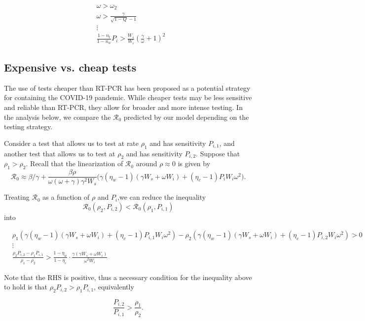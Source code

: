 \documentclass[12pt]{article}
\newcommand{\Rnum}{\mathcal{R}_0}
\theoremstyle{definition} %
\begin{document}
\begin{align}\label{eq:necsuf}
    &\omega > \omega_2 \nonumber \\
    &\omega > \frac{\gamma}{\sqrt{1-Q}-1} \nonumber \\
    &\vdots \nonumber \\
    &\frac{1-n_{t}}{1-n_{w}}P_{i}>\frac{W_{s}}{W_{i}}\left(\frac{\gamma}{\omega}+1\right)^{2}
\end{align}


\subsection{Expensive vs. cheap tests}

The use of tests cheaper than RT-PCR has been proposed as a potential strategy for containing the COVID-19 pandemic. While cheaper tests may be less sensitive and reliable than RT-PCR, they allow for broader and more intense testing. In the analysis below, we compare the $\Rnum$ predicted by our model depending on the testing strategy. 

Consider a test that allows us to test at rate $\rho_1$ and has sensitivity $P_{i,1}$, and another test that allows us to test at $\rho_2$ and has sensitivity $P_{i,2}$. Suppose that $\rho_1 > \rho_2$. Recall that the linearization of $\Rnum$ around $\rho \approx 0$ is given by $$\Rnum \approx \beta/\gamma + \frac{\beta \rho}{\omega (\omega+\gamma) \gamma^2 W_s} \Big(\gamma(\eta_w-1)(\gamma W_s+\omega W_i) + (\eta_c -1)P_iW_i \omega^2 \Big).$$


Treating $\Rnum$ as a function of $\rho$ and $P_i$,we can reduce the inequality $$\Rnum(\rho_2, P_{i,2}) < \Rnum(\rho_1, P_{i,1})$$ into 

\begin{align}\label{eq:rho1vsrho2}
    &\rho_1\left(\gamma(\eta_w-1)(\gamma W_s + \omega W_i) + (\eta_c-1)P_{i, 1}W_i\omega^2\right) - \rho_2\left(\gamma(\eta_w-1)(\gamma W_s + \omega W_i) + (\eta_c-1)P_{i, 2}W_i\omega^2\right) > 0 \nonumber \\
    &\vdots \nonumber \\
    &\frac{\rho_2P_{i, 2}-\rho_1P_{i, 1} }{\rho_1-\rho_2} > \frac{1-\eta_w}{1-\eta_c}\cdot \frac{\gamma(\gamma W_s + \omega W_i)}{\omega^2 W_i}
\end{align}

Note that the RHS is positive, thus a necessary condition for the inequality above to hold is that $\rho_2P_{i,2} > \rho_1P_{i,1}$, equivalently 

\begin{equation}
\frac{P_{i,2}}{P_{i,1}} > \frac{\rho_1}{\rho_2}.
\end{equation}
\end{document}
